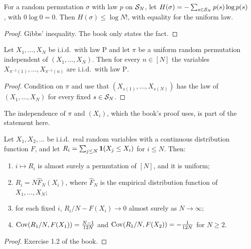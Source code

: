\begin{proposition}
  \label{prop:han-1-2}
  For a random permutation $\sigma$ with law $p$ on $\mathcal{S}_N$, let $H(\sigma)=-\sum_{s\in\mathcal{S}_N}p(s)\log p(s)$, with $0\log0=0$. Then $H(\sigma)\le\log N!$, with equality for the uniform law.
\end{proposition}
\begin{proof}
  Gibbs' inequality. The book only states the fact.
\end{proof}

\begin{proposition}
  \label{prop:han-1-3}
  Let $X_1,\dots,X_N$ be i.i.d.\ with law $\mathrm P$ and let $\pi$ be a uniform random permutation independent of $(X_1,\dots,X_N)$. Then for every $n\in[N]$ the variables $X_{\pi^{-1}(1)},\dots,X_{\pi^{-1}(n)}$ are i.i.d.\ with law $\mathrm P$.
\end{proposition}
\begin{proof}
  Condition on $\pi$ and use that $(X_{s(1)},\dots,X_{s(N)})$ has the law of $(X_1,\dots,X_N)$ for every fixed $s\in\mathcal{S}_N$.
\end{proof}
\begin{remark}
  The independence of $\pi$ and $(X_i)$, which the book's proof uses, is part of the statement here.
\end{remark}

\begin{proposition}
  \label{prop:han-1-4}
  Let $X_1,X_2,\dots$ be i.i.d.\ real random variables with a continuous distribution function $F$, and let $R_i=\sum_{j\le N}\mathbf{1}(X_j\le X_i)$ for $i\le N$. Then:
  \begin{enumerate}
    \item[(i)] $i\mapsto R_i$ is almost surely a permutation of $[N]$, and it is uniform;
    \item[(ii)] $R_i=N\widehat F_N(X_i)$, where $\widehat F_N$ is the empirical distribution function of $X_1,\dots,X_N$;
    \item[(iii)] for each fixed $i$, $R_i/N-F(X_i)\to0$ almost surely as $N\to\infty$;
    \item[(iv)] $\operatorname{Cov}(R_1/N,F(X_1))=\frac{N-1}{12N}$ and $\operatorname{Cov}(R_1/N,F(X_2))=-\frac1{12N}$ for $N\ge2$.
  \end{enumerate}
\end{proposition}
\begin{proof}
  Exercise 1.2 of the book.
\end{proof}

